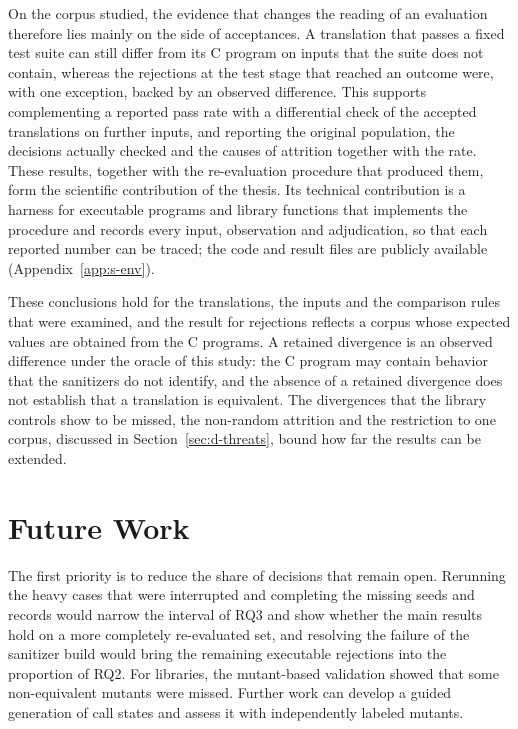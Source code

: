 On the corpus studied, the evidence that changes the reading of an evaluation therefore lies mainly on the side of acceptances. A translation that passes a fixed test suite can still differ from its C program on inputs that the suite does not contain, whereas the rejections at the test stage that reached an outcome were, with one exception, backed by an observed difference. This supports complementing a reported pass rate with a differential check of the accepted translations on further inputs, and reporting the original population, the decisions actually checked and the causes of attrition together with the rate. These results, together with the re-evaluation procedure that produced them, form the scientific contribution of the thesis. Its technical contribution is a harness for executable programs and library functions that implements the procedure and records every input, observation and adjudication, so that each reported number can be traced; the code and result files are publicly available (Appendix~\ref{app:s-env}).

\enlargethispage{\baselineskip} These conclusions hold for the translations, the inputs and the comparison rules that were examined, and the result for rejections reflects a corpus whose expected values are obtained from the C programs. A retained divergence is an observed difference under the oracle of this study: the C program may contain behavior that the sanitizers do not identify, and the absence of a retained divergence does not establish that a translation is equivalent. The divergences that the library controls show to be missed, the non-random attrition and the restriction to one corpus, discussed in Section~\ref{sec:d-threats}, bound how far the results can be extended.

\section{Future Work}\label{sec:c-future}

 The first priority is to reduce the share of decisions that remain open. Rerunning the heavy cases that were interrupted and completing the missing seeds and records would narrow the interval of RQ3 and show whether the main results hold on a more completely re-evaluated set, and resolving the failure of the sanitizer build would bring the remaining executable rejections into the proportion of RQ2. For libraries, the mutant-based validation showed that some non-equivalent mutants were missed. Further work can develop a guided generation of call states and assess it with independently labeled mutants.

